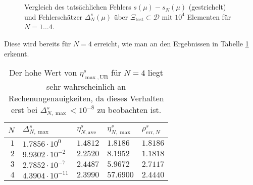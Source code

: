 \begin{figure}[tb]
    \begin{center}
        \tiny
        \newlength\figureheight
        \newlength\figurewidth
        \setlength\figureheight{5cm}
        \setlength{}
        \begin{subfigure}[b]{0.45\textwidth}
            ~
            
        \end{subfigure}
        \hfill
        \begin{subfigure}[b]{0.45\textwidth}
            ~
            
        \end{subfigure}

        \begin{subfigure}[b]{0.45\textwidth}
            
        \end{subfigure}
        \hfill
        \begin{subfigure}[b]{0.45\textwidth}
            
        \end{subfigure}
    \end{center}
    \caption{Vergleich des tatsächlichen Fehlers $s(\mu) - s_N(\mu)$ (gestrichelt) und Fehlerschätzer $\Delta^s_N(\mu)$ über $\Xi_\text{test} \subset \mathcal D$ mit $10^4$ Elementen für $N = 1 \ldots 4$.}
    \label{fig:plot_s_fehler}
\end{figure}

Diese wird bereits für $N = 4$ erreicht, wie man an den Ergebnissen in Tabelle \ref{tab:eindim} erkennt.

\begin{table}[tb]
    \begin{center}
        \begin{tabular}{r|llll}
        $N$ & $\Delta^s_{N,\max}$ & $\eta^s_{N,\text{ave}}$ & $\eta^s_{N,\max}$ & $\rho^s_{\text{err}, N}$ \\
        \hline
            $1$ & $1.7856 \cdot 10^{0}$ & $1.4812$ & $1.8186$ & $1.8186$ \\
            $2$ & $9.9302 \cdot 10^{-2}$ & $2.2520$ & $8.1952$ & $1.1818$ \\
            $3$ & $2.7852 \cdot 10^{-7}$ & $2.4487$ & $5.9672$ & $2.7117$ \\
            $4$ & $4.3904 \cdot 10^{-11}$ & $2.3990$ & $57.6900$ & $2.4440$ \\
        \end{tabular}
        \caption{Der hohe Wert von $\eta^s_{\max,\text{UB}}$ für $N = 4$ liegt sehr wahrscheinlich an Rechenungenauigkeiten, da dieses Verhalten erst bei $\Delta^s_{N,\max} < 10^{-8}$ zu beobachten ist.}
        \label{tab:eindim}
    \end{center}
\end{table}

